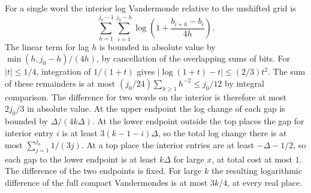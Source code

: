 For a single word the interior log Vandermonde relative to the
unshifted grid is
\[
 \sum_{h=1}^{j_0-1}\sum_{i=1}^{j_0-h}
    \log\left(1+\frac{b_{i+h}-b_i}{4h}\right).
\]
The linear term for lag \(h\) is bounded in absolute value by
\(\min(h,j_0-h)/(4h)\), by cancellation of the overlapping sums of
bits. For \(|t|\le1/4\), integration of \(1/(1+t)\) gives
\(|\log(1+t)-t|\le(2/3)t^2\). The sum of these remainders is at
most \((j_0/24)\sum_{h\ge1}h^{-2}\le j_0/12\) by integral
comparison. The difference for two words on the interior is
therefore at most \(2j_0/3\) in absolute value. At the upper endpoint the
log change of each gap is bounded by \(\Delta/(4k\Delta)\).
At the lower endpoint outside the top places the gap for interior
entry \(i\) is at least \(3(k-1-i)\Delta\), so the total log change
there is at most \(\sum_{j=1}^{j_0}1/(3j)\). At a top place the
interior entries are at least \(-\Delta-1/2\), so each gap to
the lower endpoint is at least \(k\Delta\) for large \(x\), at
total cost at most \(1\). The difference of the two endpoints is
fixed. For large \(k\) the resulting logarithmic difference of the
full compact Vandermondes is at most \(3k/4\), at every real place.


